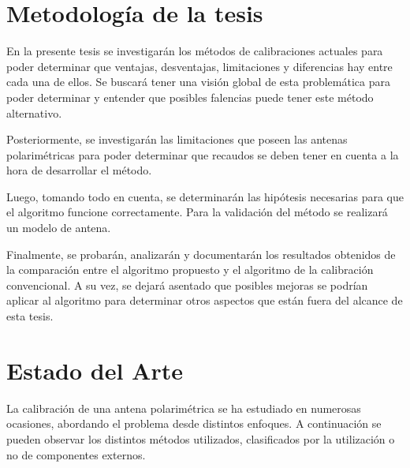 \documentclass[a4paper,10pt]{article}
\begin{document}
	\section{Metodología de la tesis}

		En la presente tesis se investigarán los métodos de calibraciones 
	actuales para poder determinar que ventajas, desventajas, limitaciones y 
	diferencias hay entre cada una de ellos. Se buscará tener una visión global
	de esta problemática para poder determinar y entender que posibles falencias
	puede tener este método alternativo.

		Posteriormente, se investigarán las limitaciones que poseen las antenas 
	polarimétricas para poder determinar que recaudos se deben tener en cuenta a
	la hora de desarrollar el método.

		Luego, tomando todo en cuenta, se determinarán las hipótesis necesarias
	para que el algoritmo funcione correctamente. Para la validación del método
	se realizará un modelo de antena.
		
		Finalmente, se probarán, analizarán y documentarán los resultados 
	obtenidos de la comparación entre el algoritmo propuesto y el algoritmo de
	la calibración convencional. A su vez, se dejará asentado que posibles 
	mejoras se podrían aplicar al algoritmo para determinar otros aspectos que
	están fuera del alcance de esta tesis.

	\section{Estado del Arte}
		La calibración de una antena polarimétrica se ha estudiado en numerosas 
	ocasiones, abordando el problema desde distintos enfoques. A continuación se
    pueden observar los distintos métodos utilizados, clasificados por la 
    utilización o no de componentes externos.
\end{document}
